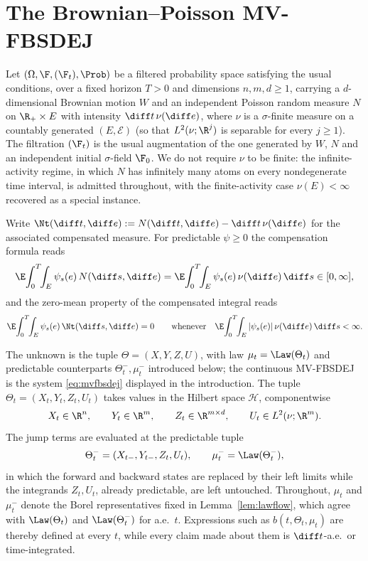 \section{The Brownian--Poisson MV-FBSDEJ}\label{sec:main-assumptions}
Let $(\Omega,\F,(\F_t),\Prob)$ be a filtered probability space satisfying the usual
conditions, over a fixed horizon $T>0$ and dimensions $n,m,d\ge1$, carrying a
$d$-dimensional Brownian motion $W$ and an independent Poisson random measure $N$ on
$\R_+\times E$ with intensity $\diff t\,\nu(\diff e)$, where $\nu$ is a
$\sigma$-finite measure on a countably generated $(E,\mathcal E)$ (so that
$L^2(\nu;\R^j)$ is separable for every $j\ge1$). The filtration $(\F_t)$ is the usual augmentation of the one generated by $W$,
$N$ and an independent initial $\sigma$-field $\F_0$.
We do not require $\nu$ to be finite: the infinite-activity regime,
in which $N$ has infinitely many atoms on every nondegenerate time interval, is admitted
throughout, with the finite-activity case $\nu(E)<\infty$ recovered as a special instance.

Write $\Nt(\diff t,\diff e):=N(\diff t,\diff e)-\diff t\,\nu(\diff e)$ for the
associated compensated measure. For predictable $\psi\ge0$ the compensation formula
reads
\begin{equation}\label{eq:compid}
\E\!\int_0^T\!\!\int_E\psi_s(e)\,N(\diff s,\diff e)
=\E\!\int_0^T\!\!\int_E\psi_s(e)\,\nu(\diff e)\,\diff s\in[0,\infty],
\end{equation}
and the zero-mean property of the compensated integral reads
\begin{equation}\label{eq:zeromean}
\E\!\int_0^T\!\!\int_E\psi_s(e)\,\Nt(\diff s,\diff e)=0
\qquad\text{whenever}\quad
\E\!\int_0^T\!\!\int_E|\psi_s(e)|\,\nu(\diff e)\,\diff s<\infty .
\end{equation}

The unknown is the tuple $\Theta=(X,Y,Z,U)$, with law $\mu_t=\Law(\Theta_t)$ and predictable
counterparts $\Theta_t^-,\mu_t^-$ introduced below; the continuous MV-FBSDEJ is the system
\eqref{eq:mvfbsdej} displayed in the introduction. The tuple
$\Theta_t=(X_t,Y_t,Z_t,U_t)$ takes values in the Hilbert space $\mathcal H$,
componentwise
\[
X_t\in\R^n,\qquad Y_t\in\R^m,\qquad Z_t\in\R^{m\times d},\qquad U_t\in L^2(\nu;\R^m).
\]
The jump terms are evaluated at the predictable tuple
\[
\Theta_t^-=(X_{t-},Y_{t-},Z_t,U_t),\qquad \mu_t^-=\Law(\Theta_t^-),
\]
in which the forward and backward states are replaced by their left limits while the
integrands $Z_t,U_t$, already predictable, are left untouched.
Throughout, $\mu_t$ and $\mu_t^-$ denote the Borel
representatives fixed in Lemma~\ref{lem:lawflow}, which agree with $\Law(\Theta_t)$ and
$\Law(\Theta_t^-)$ for a.e.\ $t$. Expressions such as $b(t,\Theta_t,\mu_t)$ are thereby
defined at every $t$, while every claim made about them is $\diff t$-a.e.\ or
time-integrated.

